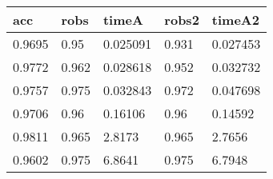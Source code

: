 \begin{tabular}{lllll}
acc & robs & timeA & robs2 & timeA2 \\ 
\hline 
0.9695 & 0.95 & 0.025091 & 0.931 & 0.027453 \\ 
0.9772 & 0.962 & 0.028618 & 0.952 & 0.032732 \\ 
0.9757 & 0.975 & 0.032843 & 0.972 & 0.047698 \\ 
0.9706 & 0.96 & 0.16106 & 0.96 & 0.14592 \\ 
0.9811 & 0.965 & 2.8173 & 0.965 & 2.7656 \\ 
0.9602 & 0.975 & 6.8641 & 0.975 & 6.7948 \\ 
\hline 
\end{tabular}